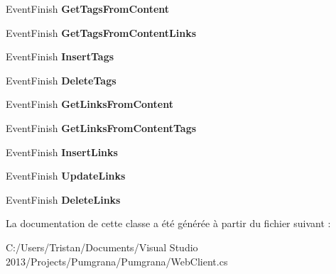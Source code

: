 \begin{DoxyCompactItemize}
\item 
\hypertarget{class_pumgrana_1_1_pumgrana_web_client_a7c39822e11f10dc0a5b20da6565111cd}{Event\+Finish {\bfseries Get\+Tags\+From\+Content}}\label{class_pumgrana_1_1_pumgrana_web_client_a7c39822e11f10dc0a5b20da6565111cd}

\item 
\hypertarget{class_pumgrana_1_1_pumgrana_web_client_adc019a70bd2ef67d5342c2c294a470a0}{Event\+Finish {\bfseries Get\+Tags\+From\+Content\+Links}}\label{class_pumgrana_1_1_pumgrana_web_client_adc019a70bd2ef67d5342c2c294a470a0}

\item 
\hypertarget{class_pumgrana_1_1_pumgrana_web_client_a885d0a3fa2e6be6814ed6347bf5d8c68}{Event\+Finish {\bfseries Insert\+Tags}}\label{class_pumgrana_1_1_pumgrana_web_client_a885d0a3fa2e6be6814ed6347bf5d8c68}

\item 
\hypertarget{class_pumgrana_1_1_pumgrana_web_client_a89f2442427d59b2663ba7a27b8a70fec}{Event\+Finish {\bfseries Delete\+Tags}}\label{class_pumgrana_1_1_pumgrana_web_client_a89f2442427d59b2663ba7a27b8a70fec}

\item 
\hypertarget{class_pumgrana_1_1_pumgrana_web_client_a7da80fc26692aac8ce19a51049cac3f3}{Event\+Finish {\bfseries Get\+Links\+From\+Content}}\label{class_pumgrana_1_1_pumgrana_web_client_a7da80fc26692aac8ce19a51049cac3f3}

\item 
\hypertarget{class_pumgrana_1_1_pumgrana_web_client_a854e32ee2eacc9095834d05deef69cef}{Event\+Finish {\bfseries Get\+Links\+From\+Content\+Tags}}\label{class_pumgrana_1_1_pumgrana_web_client_a854e32ee2eacc9095834d05deef69cef}

\item 
\hypertarget{class_pumgrana_1_1_pumgrana_web_client_a8bd8f9216cd2d58c1a9fc48e49ad328a}{Event\+Finish {\bfseries Insert\+Links}}\label{class_pumgrana_1_1_pumgrana_web_client_a8bd8f9216cd2d58c1a9fc48e49ad328a}

\item 
\hypertarget{class_pumgrana_1_1_pumgrana_web_client_ad4aa458028cfe6e108fa49a7d78be226}{Event\+Finish {\bfseries Update\+Links}}\label{class_pumgrana_1_1_pumgrana_web_client_ad4aa458028cfe6e108fa49a7d78be226}

\item 
\hypertarget{class_pumgrana_1_1_pumgrana_web_client_ac278df2fce389eaaa754878df7bd631b}{Event\+Finish {\bfseries Delete\+Links}}\label{class_pumgrana_1_1_pumgrana_web_client_ac278df2fce389eaaa754878df7bd631b}

\end{DoxyCompactItemize}


La documentation de cette classe a été générée à partir du fichier suivant \+:\begin{DoxyCompactItemize}
\item 
C\+:/\+Users/\+Tristan/\+Documents/\+Visual Studio 2013/\+Projects/\+Pumgrana/\+Pumgrana/Web\+Client.\+cs\end{DoxyCompactItemize}
